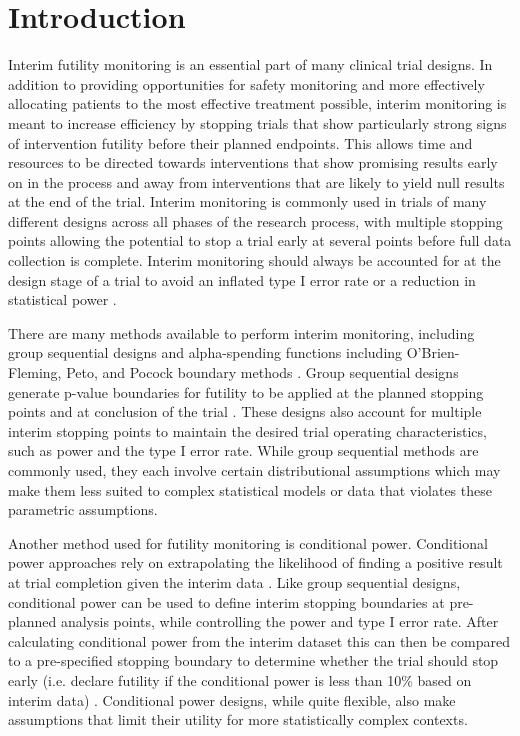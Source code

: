\documentclass[Afour,sageh,times,square,numbers]{sagej}
\begin{document}

\maketitle

\section{Introduction}

Interim futility monitoring is an essential part of many clinical trial designs.  In addition to providing opportunities for safety monitoring and more effectively allocating patients to the most effective treatment possible, interim monitoring is meant to increase efficiency by stopping trials that show particularly strong signs of intervention futility before their planned endpoints.  This allows time and resources to be directed towards interventions that show promising results early on in the process and away from interventions that are likely to yield null results at the end of the trial.  Interim monitoring is commonly used in trials of many different designs across all phases of the research process, with multiple stopping points allowing the potential to stop a trial early at several points before full data collection is complete.  Interim monitoring should always be accounted for at the design stage of a trial to avoid an inflated type I error rate or a reduction in statistical power \cite{R1,R2,R3}.

There are many methods available to perform interim monitoring, including group sequential designs and alpha-spending functions including O’Brien-Fleming, Peto, and Pocock boundary methods \cite{R1,R2,R3,R5,R6,R6b,R6c}.  Group sequential designs generate p-value boundaries for futility to be applied at the planned stopping points and at conclusion of the trial \cite{R6c}.  These designs also account for multiple interim stopping points to maintain the desired trial operating characteristics, such as power and the type I error rate.  While group sequential methods are commonly used, they each involve certain distributional assumptions which may make them less suited to complex statistical models or data that violates these parametric assumptions. 

Another method used for futility monitoring is conditional power.  Conditional power approaches rely on extrapolating the likelihood of finding a positive result at trial completion given the interim data \cite{R7a}.  Like group sequential designs, conditional power can be used to define interim stopping boundaries at pre-planned analysis points, while controlling the power and type I error rate.  After calculating conditional power from the interim dataset this can then be compared to a pre-specified stopping boundary to determine whether the trial should stop early (i.e. declare futility if the conditional power is less than 10\% based on interim data) \cite{R7b}.  Conditional power designs, while quite flexible, also make assumptions that limit their utility for more statistically complex contexts.
\end{document}
